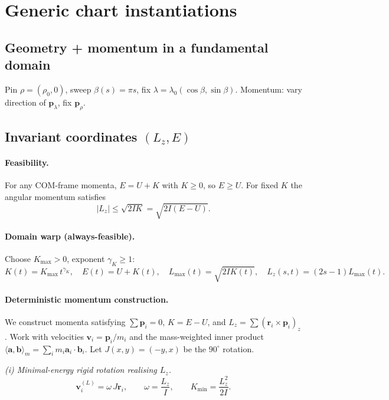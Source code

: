 \documentclass[11pt]{report}
\def\boldsymbol#1{#1}%
\begin{document}
\section{Generic chart instantiations}
\label{sec:views}

\subsection{Geometry + momentum in a fundamental domain}
\label{sec:geom_mom_view}

Pin $\boldsymbol\rho=(\rho_0,0)$, sweep $\beta(s)=\pi s$, fix $\boldsymbol\lambda=\lambda_0(\cos\beta,\sin\beta)$. Momentum: vary direction of $\mathbf p_\lambda$, fix $\mathbf p_\rho$.

\subsection{Invariant coordinates $(L_z,E)$}
\label{sec:LE_view}

\paragraph{Feasibility.} For any COM-frame momenta, $E=U+K$ with $K\ge 0$, so $E\ge U$. For fixed $K$ the angular momentum satisfies
\[
\boxed{|L_z|\le\sqrt{2IK}=\sqrt{2I(E-U)}.}
\]

\paragraph{Domain warp (always-feasible).} Choose $K_{\max}>0$, exponent $\gamma_K\ge 1$:
\[
\boxed{K(t)=K_{\max}\,t^{\gamma_K},\quad E(t)=U+K(t),\quad L_{\max}(t)=\sqrt{2IK(t)},\quad L_z(s,t)=(2s-1)L_{\max}(t).}
\]

\paragraph{Deterministic momentum construction.} We construct momenta satisfying $\sum\mathbf p_i=0$, $K=E-U$, and $L_z=\sum(\mathbf r_i\times\mathbf p_i)_z$. Work with velocities $\mathbf v_i=\mathbf p_i/m_i$ and the mass-weighted inner product $\langle\mathbf a,\mathbf b\rangle_m=\sum_i m_i\mathbf a_i\cdot\mathbf b_i$. Let $J(x,y)=(-y,x)$ be the $90^\circ$ rotation.

\emph{(i) Minimal-energy rigid rotation realising $L_z$.}
\[
\boxed{\mathbf v_i^{(L)}=\omega\,J\mathbf r_i,\qquad \omega=\frac{L_z}{I},\qquad K_{\min}=\frac{L_z^2}{2I}.}
\]
\end{document}
